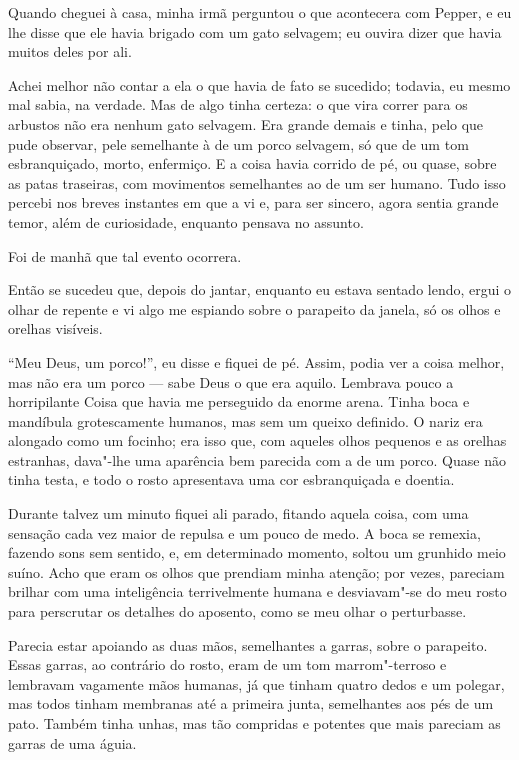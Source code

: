 Quando cheguei à casa, minha irmã perguntou o que acontecera com Pepper, e eu lhe disse que ele havia brigado com um
gato selvagem; eu ouvira dizer que havia muitos deles por ali.

Achei melhor não contar a ela o que havia de fato se sucedido; todavia, eu mesmo mal sabia, na verdade. Mas de algo
tinha certeza: o que vira correr para os arbustos não era nenhum gato selvagem. Era grande demais e tinha,
pelo que pude observar, pele semelhante à de um porco selvagem, só que de um tom esbranquiçado, morto, enfermiço. E a
coisa havia corrido de pé, ou quase, sobre as patas traseiras, com movimentos semelhantes ao de um ser humano. Tudo
isso percebi nos breves instantes em que a vi e, para ser sincero, agora sentia grande temor, além de curiosidade,
enquanto pensava no assunto.

Foi de manhã que tal evento ocorrera.

Então se sucedeu que, depois do jantar, enquanto eu estava sentado lendo, ergui o olhar de repente e vi algo me
espiando sobre o parapeito da janela, só os olhos e orelhas visíveis.

``Meu Deus, um porco!'', eu disse e fiquei de pé. Assim, podia ver a coisa melhor, mas não era um porco --- sabe Deus o
que era aquilo. Lembrava pouco a horripilante Coisa que havia me perseguido da enorme arena. Tinha boca e mandíbula
grotescamente humanos, mas sem um queixo definido. O nariz era alongado como um focinho; era isso que,
com aqueles olhos pequenos e as orelhas estranhas, dava"-lhe uma aparência bem parecida com a de um
porco. Quase não tinha testa, e todo o rosto apresentava uma cor esbranquiçada e doentia.

Durante talvez um minuto fiquei ali parado, fitando aquela coisa, com uma sensação cada vez maior de repulsa e um pouco
de medo. A boca se remexia, fazendo sons sem sentido, e, em determinado momento, soltou um grunhido meio suíno.
Acho que eram os olhos que prendiam minha atenção; por vezes, pareciam brilhar com uma inteligência terrivelmente
humana e desviavam"-se do meu rosto para perscrutar os detalhes do aposento, como se meu olhar o perturbasse.

Parecia estar apoiando as duas mãos, semelhantes a garras, sobre o parapeito. Essas garras, ao contrário do rosto, eram
de um tom marrom"-terroso e lembravam vagamente mãos humanas, já que tinham quatro dedos e um polegar, mas todos tinham
membranas até a primeira junta, semelhantes aos pés de um pato. Também tinha unhas, mas tão compridas e potentes que
mais pareciam as garras de uma águia.

